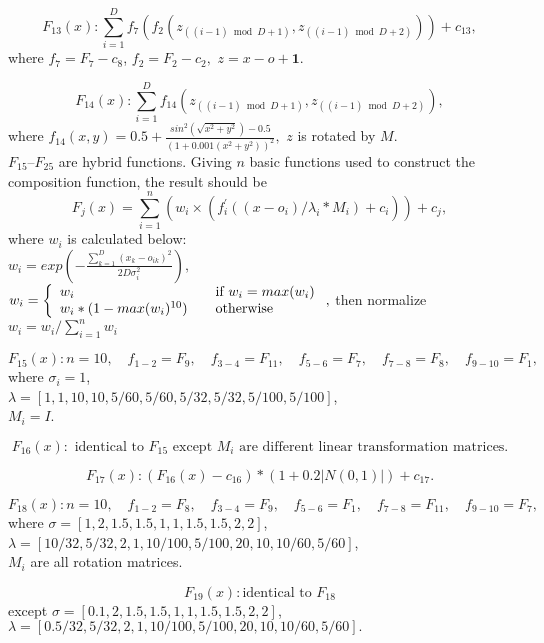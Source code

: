 \[F_{13}(x): \sum\limits_{i=1}^Df_7\left(f_2(z_{\left((i-1)\bmod D
+1\right)},
z_{\left((i-1)\bmod D +2\right)})\right)+c_{13},\]
where $f_7 = F_7 -c_8$, $f_2 = F_2-c_2,$ $z = x - o + \mathbf{1}.$

\[F_{14}(x):  \sum\limits_{i=1}^Df_{14}(z_{\left((i-1)\bmod D
+1\right)},
z_{\left((i-1)\bmod D +2\right)}),\]
where $f_{14}(x,y) = 0.5 + \frac{sin^2\left(\sqrt{x^2+y^2}
\right)-0.5}{\left(1+0.001(x^2+y^2)\right)^2},$ 
$z$ is rotated by $M.$
\\
$F_{15}$--$F_{25}$ are hybrid functions.
Giving $n$ basic functions used to construct the composition function, the
result should be 
\[F_j(x) = \sum\limits_{i=1}^n\left(w_i \times
\left(f_{i}^{'}((x-o_i)/\lambda_i * M_i) + c_i\right)\right) + c_j,\]
where $w_i$ is calculated below:\\$w_i = exp \left(- \frac{\sum\limits_{k=1}^D\left(x_k -
o_{ik}\right)^2}{2D\sigma_i^2} \right),$\\
$w_i = \left\{ 
    \begin{array}{l l}
          w_i & \quad \text{if $w_i = max(w_i)$}\\
          w_i*(1-max(w_i)^{10}) & \quad \text{otherwise}
                \end{array} \right. ,$
then normalize $w_i = w_i / \sum\limits_{i=1}^nw_i $

\[F_{15}(x): n = 10 ,\quad f_{1-2} = F_9,\quad f_{3-4}= F_{11},\quad f_{5-6} =
  F_7,\quad
f_{7-8} = F_8,\quad f_{9-10}= F_1, \]
where $\sigma_i = 1$,\\$\lambda =
[1,1,10,10,5/60,5/60,5/32,5/32,5/100,5/100]$,\\$M_i = I$. 

\[F_{16}(x):\text{ identical to $F_{15}$ except $M_i$ are different
linear transformation matrices.}\]

\[F_{17}(x): (F_{16}(x) - c_{16}) * (1+0.2|N(0,1)|) + c_{17}.\]

\[F_{18}(x): n = 10,\quad f_{1-2} = F_8, \quad f_{3-4} = F_9, \quad
f_{5-6} = F_1, \quad f_{7-8} = F_{11}, \quad f_{9-10}= F_7,\]
where $\sigma = [1,2,1.5,1.5,1,1,1.5,1.5,2,2]$,\\$\lambda =
[10/32,5/32,2,1,10/100,5/100,20,10,10/60,5/60]$,\\$M_i$ are all rotation
matrices. 

\[F_{19}(x): \text{identical to $F_{18}$}\]
except $\sigma = [0.1,2,1.5,1.5,1,1,1.5,1.5,2,2]$,\\$\lambda =
[0.5/32,5/32,2,1,10/100,5/100,20,10,10/60,5/60].$

